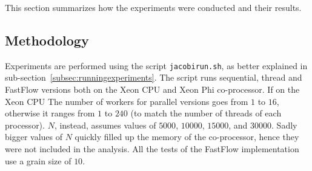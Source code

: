 This section summarizes how the experiments were conducted and their results.

\subsection{Methodology} \label{subsec:methodology}
Experiments are performed using the script \verb|jacobirun.sh|, as better explained in sub-section~\ref{subsec:runningexperiments}.
The script runs sequential, thread and FastFlow versions both on the Xeon CPU and Xeon Phi co-processor.
If on the Xeon CPU The number of workers for parallel versions goes from $1$ to $16$, otherwise it ranges from $1$ to $240$ (to match the number of threads of each processor).
$N$, instead, assumes values of $5000$, $10000$, $15000$, and $30000$. Sadly bigger values of $N$ quickly filled up the memory of the co-processor, hence they were not included in the analysis.
All the tests of the FastFlow implementation use a grain size of $10$.

